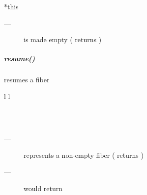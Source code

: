 \returns
\begin{description}
    \item[*this]
\end{description}

\postcond
\begin{description}
    \item[---]  is made empty ( returns )
\end{description}


\subparagraph*{resume()}
resumes a fiber

\begin{tabular}{ l l }
    \midrule

    \\
    \\

    \midrule
\end{tabular}

\requires
\begin{description}
    \item[---]  represents a non-empty fiber ( returns )
    \item[---] \canxtresume would return 
\end{description}

